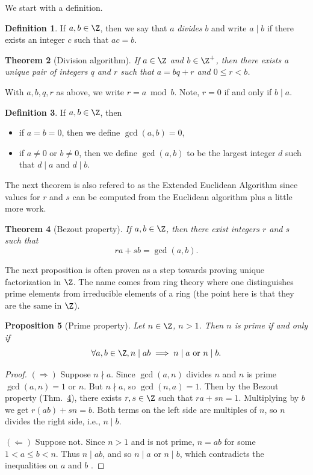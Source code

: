 \documentclass[12pt]{amsart}
\theoremstyle{plain}
\newtheorem{thm}{Theorem}[section]
\newtheorem{prop}[thm]{Proposition}
\theoremstyle{definition}
\newtheorem{defn}[thm]{Definition}
\theoremstyle{remark}
\begin{document}
We start with a definition.
\begin{defn}\label{divides}
  If $a,b\in\Z$, then we say that $a$ \emph{divides} $b$
  and write $a\mid b$ if there exists an integer $c$ such that $ac=b$.
\end{defn}

\begin{thm}[Division algorithm] \label{div-alg}
  If $a\in \Z$ and $b\in\Z^+$, then there exists a unique pair of integers $q$ and $r$
  such that $a=bq+r$ and $0\leq r<b$.
\end{thm}
With $a,b,q,r$ as above, we write $r=a\bmod b$.  Note, $r=0$ if and
only if $b\mid a$.

\begin{defn}
  If $a,b\in\Z$, then
  \begin{itemize}
  \item if $a=b=0$, then we define $\gcd(a,b)=0$,
  \item if $a\neq 0$ or $b\neq 0$, then we define $\gcd(a,b)$ to be
    the largest integer $d$ such that $d\mid a$ and $d\mid b$.
 \end{itemize}
 \end{defn}

The next theorem is also refered to as the Extended Euclidean
Algorithm since values for $r$ and $s$ can be computed from the
Euclidean algorithm plus a little more work.

\begin{thm}[Bezout property] \label{bezout}
  If $a,b\in\Z$, then there exist integers $r$ and $s$ such that
  $$ ra+sb=\gcd(a,b).$$
\end{thm}

The next proposition is often proven as a step towards proving unique
factorization in $\Z$.  The name comes from ring theory where one
distinguishes prime elements from irreducible elements of a ring (the
point here is that they are the same in $\Z$).

\begin{prop}[Prime property] \label{prime-prop}
  Let $n\in\Z$, $n>1$.  Then $n$ is prime if and only if
  \[ \forall a,b\in\Z, n\mid ab\implies n\mid a \text{ or } n\mid b.\]
\end{prop}
\begin{proof}
  $(\Rightarrow)$ Suppose $n\nmid a$.  Since $\gcd(a,n)$ divides $n$
  and $n$ is prime $\gcd(a,n)=1$ or $n$.  But $n\nmid a$, so
  $\gcd(n,a)=1$.  Then by the Bezout property (Thm.~\ref{bezout}), there
  exists $r,s\in\Z$ such that $ra+sn=1$.  Multiplying by $b$ we get
  $r(ab) + sn = b$.  Both terms on the left side are multiples of $n$,
  so $n$ divides the right side, i.e., $n\mid b$.

$(\Leftarrow)$
Suppose not.  Since $n>1$ and is not prime, $n=ab$ for some $1<a\leq
b<n$.  Thus $n\mid ab$, and so $n\mid a$ or $n\mid b$, which
contradicts the inequalities on $a$ and $b$ \con.
\end{proof}
\end{document}
